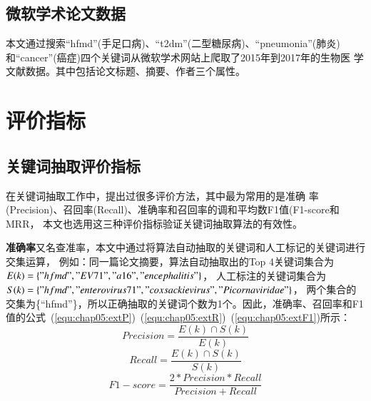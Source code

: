 \subsection{微软学术论文数据}
本文通过搜索“hfmd”(手足口病)、“t2dm”(二型糖尿病)、“pneumonia”(肺炎)%
和“cancer”(癌症)四个关键词从微软学术网站上爬取了2015年到2017年的生物医%
学文献数据。其中包括论文标题、摘要、作者三个属性。

\section{评价指标}
\subsection{关键词抽取评价指标}
在关键词抽取工作中，提出过很多评价方法，其中最为常用的是准确%
率(Precision)、召回率(Recall)、准确率和召回率的调和平均数F1值(F1-score和MRR，%
本文也选用这三种评价指标验证关键词抽取算法的有效性。

\textbf{准确率}又名查准率，本文中通过将算法自动抽取的关键词和人工标记的关键词进行交集运算，%
例如：同一篇论文摘要，算法自动抽取出的Top
4关键词集合为 $E(k) = \{"hfmd","EV71","a16","encephalitis"\}$，
人工标注的关键词集合为
$S(k) = \{"hfmd","enterovirus 71"," coxsackie virus","Picornaviridae"\}$， 两个集合的交集为\{“hfmd”\}，所以正确抽取的关键词个数为1个。因此，准确率、召回率和F1值的公式~(\ref{equ:chap05:extP})~(\ref{equ:chap05:extR})~(\ref{equ:chap05:extF1})所示：
\begin{equation}
\label{equ:chap05:extP}
Precision = \frac{E(k) \cap S(k)}{E(k)}
\end{equation}
\begin{equation}
\label{equ:chap05:extR}
Recall = \frac{E(k) \cap S(k)}{S(k)}
\end{equation}
\begin{equation}
\label{equ:chap05:extF1}
F1-score = \frac{2*Precision*Recall}{Precision+Recall}
\end{equation}

